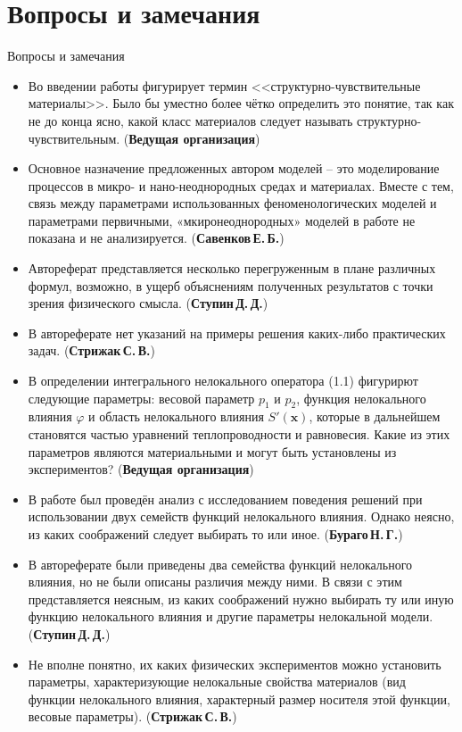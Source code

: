 \section{Вопросы и замечания}
\begin{frame}{Вопросы и замечания}
	\begin{itemize}
		\justifying
		\item Во введении работы фигурирует термин <<структурно-чувствительные материалы>>. Было бы уместно более чётко определить это понятие, так как не до конца ясно, какой класс материалов следует называть структурно-чувствительным. (\textbf{Ведущая организация})
		\item Основное назначение предложенных автором моделей -- это моделирование процессов в микро- и нано-неоднородных средах и материалах. Вместе с тем, связь между параметрами использованных феноменологических моделей и параметрами первичными, «мкиронеоднородных» моделей в работе не показана и не анализируется. (\textbf{Савенков\,Е.\,Б.})
		\item Автореферат представляется несколько перегруженным в плане различных формул, возможно, в ущерб объяснениям полученных результатов с точки зрения физического смысла. (\textbf{Ступин\,Д.\,Д.})
		\item В автореферате нет указаний на примеры решения каких-либо практических задач. (\textbf{Стрижак\,С.\,В.})
	\end{itemize}
\end{frame}

\begin{frame}
	\begin{itemize}
		\justifying
		\item В определении интегрального нелокального оператора (1.1) фигурирют следующие параметры: весовой параметр $p_1$ и $p_2$, функция нелокального влияния $\varphi$ и область нелокального влияния $S'(\boldsymbol{x})$, которые в дальнейшем становятся частью уравнений теплопроводности и равновесия. Какие из этих параметров являются материальными и могут быть установлены из экспериментов? (\textbf{Ведущая организация})
		\item В работе был проведён анализ с исследованием поведения решений при использовании двух семейств функций нелокального влияния. Однако неясно, из каких соображений следует выбирать то или иное. (\textbf{Бураго\,Н.\,Г.})
		\item В автореферате были приведены два семейства функций нелокального влияния, но не были описаны различия между ними. В связи с этим представляется неясным, из каких соображений нужно выбирать ту или иную функцию нелокального влияния и другие параметры нелокальной модели. (\textbf{Ступин\,Д.\,Д.})
		\item Не вполне понятно, их каких физических экспериментов можно установить параметры, характеризующие нелокальные свойства материалов (вид функции нелокального влияния, характерный размер носителя этой функции, весовые параметры). (\textbf{Стрижак\,С.\,В.})
	\end{itemize}
\end{frame}

